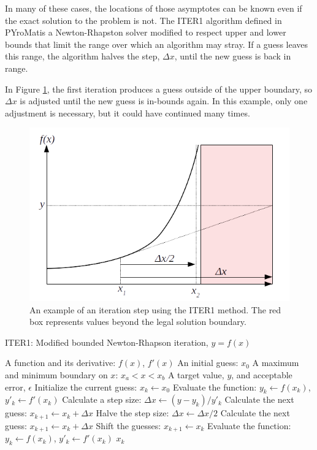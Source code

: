 \documentclass{article}
\def\pm{PYroMat}
\begin{document}
In many of these cases, the locations of those asymptotes can be known even if the exact solution to the problem is not.  The ITER1 algorithm defined in \pm is a Newton-Rhapston solver modified to respect upper and lower bounds that limit the range over which an algorithm may stray.  If a guess leaves this range, the algorithm halves the step, $\Delta x$, until the new guess is back in range.

In Figure \ref{fig:1d:newton:bounded}, the first iteration produces a guess outside of the upper boundary, so $\Delta x$ is adjusted until the new guess is in-bounds again.  In this example, only one adjustment is necessary, but it could have continued many times.

\begin{figure}
\centering
\includegraphics[width = 0.8\linewidth]{figures/1d_newton_bounded}
\caption{An example of an iteration step using the ITER1 method.  The red box represents values beyond the legal solution boundary.}\label{fig:1d:newton:bounded}
\end{figure}

\begin{algorithm}
\caption{ITER1: Modified bounded Newton-Rhapson iteration, $y = f(x)$}\label{alg:1d:newton}
\begin{algorithmic}
\REQUIRE A function and its derivative: $f(x)$, $f'(x)$
\REQUIRE An initial guess: $x_0$
\REQUIRE A maximum and minimum boundary on $x$: $x_a < x <x_b$
\REQUIRE A target value, $y$, and acceptable error, $\epsilon$
\STATE Initialize the current guess: $x_k \leftarrow x_0$
\STATE Evaluate the function: $y_k \leftarrow f(x_k)$, $y'_k \leftarrow f'(x_k)$
\STATE Calculate a step size: $\Delta x \leftarrow (y - y_k)/y'_k$
\STATE Calculate the next guess: $x_{k+1} \leftarrow x_k + \Delta x$
\STATE Halve the step size: $\Delta x \leftarrow \Delta x / 2$
\STATE Calculate the next guess: $x_{k+1} \leftarrow x_k + \Delta x$
\ENDWHILE
\STATE Shift the guesses: $x_{k+1} \leftarrow x_k$
\STATE Evaluate the function: $y_k \leftarrow f(x_k)$, $y'_k \leftarrow f'(x_k)$
\ENDWHILE
\RETURN $x_k$
\end{algorithmic}
\end{algorithm}
\end{document}
